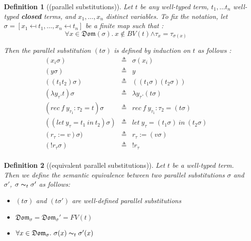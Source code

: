 \documentclass[a4paper,11pt,oneside]{article}
\theoremstyle{plain}
\newtheorem{definition}{Definition}[subsection]
\newcommand{\bwedge}{\boldsymbol{\wedge}}
\begin{document}
  



	\begin{definition}[(parallel substitutions)]
	Let $t$ be any well-typed term, $t_1, \dots t_n$ well-typed 
	\textit{\textbf{closed}} terms, and $x_1, \dots, x_n$ distinct variables.
	To fix the notation, 
	let $\sigma = [x_1 \mapsfrom t_1, \dots, x_n \mapsfrom t_n] $ be
	a finite map such that :  	
	$$\forall x\in\mathfrak{Dom}(\sigma).~x\notin BV(t)\bwedge\tau_x=
	\tau_{\sigma(x)}$$

	Then the parallel substitution $(t\sigma)$ is defined by induction on $t$ 
	as follows :
	\begin{displaymath}
	\begin{array}{lll}
	 (x_i\sigma)& \triangleq & \sigma(x_i)\\
	 (y\sigma)& \triangleq & y \\
	 ((t_1t_2)\sigma) & \triangleq & ((t_1\sigma)(t_2\sigma))\\
	 (\lambda y_{\tau}. t)\sigma & \triangleq & \lambda y_\tau. (t\sigma)\\
	 (rec~f~y_{\tau_1} : \tau_2 = t)\sigma & \triangleq 
	   & rec~f~y_{\tau_1} : \tau_2 = (t\sigma) \\
	 ((let~y_\tau = t_1~ in~ t_2)\sigma) & \triangleq 
	   & let~y_\tau = (t_1\sigma)~in~ (t_2\sigma)\\
	  (r_\tau := v)\sigma)	& \triangleq & r_\tau := (v\sigma) \\
	 (!r_\tau\sigma) & \triangleq & !r_\tau \\
	     	 
	\end{array}
	\end{displaymath}
	\label{}
	\end{definition}

	\begin{definition}[(equivalent parallel substitutions)]
	Let $t$ be a well-typed term. Then we define the semantic equivalence
	between two parallel substitutions $\sigma$ and $\sigma'$, 
	$\sigma \thicksim_t \sigma'$ as follows:
	\begin{itemize}
	\item[(1)] 
	  $(t\sigma)$ and $(t\sigma')$ are well-defined parallel substitutions
	\item[(2)]
	  $ \mathfrak{Dom}_\sigma = \mathfrak{Dom}_\sigma' = FV(t)$
	\item[(3)]
		$ \forall x \in \mathfrak{Dom}_\sigma.~ \sigma(x) \thicksim_t \sigma'(x)$
	\end{itemize}	 
	\label{equiv-subst-d}
	\end{definition}
\end{document}

